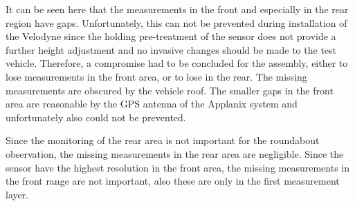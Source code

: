 \documentclass[11pt,oneside,openright]{mpreport}
\begin{document}

It can be seen here that the measurements in the front and especially in the rear region have gaps. Unfortunately, this can not be prevented during installation of the Velodyne since the holding pre-treatment of the sensor does not provide a further height adjustment and no invasive changes should be made to the test vehicle. 
Therefore, a compromise had to be concluded for the assembly, either to lose measurements in the front area, or to lose in the rear.
The missing measurements are obscured by the vehicle roof. The smaller gaps in the front area are reasonable by the GPS antenna of the Applanix system and unfortunately also could not be prevented.


Since the monitoring of the rear area is not important for the roundabout observation, the missing measurements in the rear area are negligible. 
Since the sensor have the highest resolution in the front area, the missing measurements in the front range are not important,
also these are only in the first measurement layer.


\end{document}

